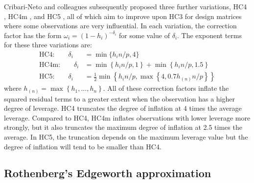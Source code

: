 \documentclass[12pt]{article}\usepackage[]{graphicx}\usepackage[]{color}
\begin{document}
Cribari-Neto and colleagues subsequently proposed three further variations, HC4 \citep{Cribari-Neto2004asymptotic}, HC4m \citep{Cribari-Neto2011new}, and HC5 \citep{Cribari-Neto2007inference}, all of which aim to improve upon HC3 for design matrices where some observations are very influential. 
In each variation, the correction factor has the form $\omega_i = \left(1 - h_i\right)^{-\delta_i}$ for some value of $\delta_i$. 
The exponent terms for these three variations are:
\begin{align*}
\text{HC4:} \qquad \delta_i &= \min\{h_i n / p, 4\} \\
\text{HC4m:} \qquad \delta_i &= \min\left\{h_i n / p, 1 \right\} + \min\left\{h_i n / p, 1.5 \right\} \\
\text{HC5:} \qquad \delta_i &= \frac{1}{2}\min\left\{h_i n / p, \max \left\{4, 0.7 h_{(n)} n / p\right\}\right\}
\end{align*}
where $h_{(n)} = \max\left\{h_{1},...,h_{n}\right\}$.
All of these correction factors inflate the squared residual terms to a greater extent when the observation has a higher degree of leverage. HC4 truncates the degree of inflation at 4 times the average leverage. Compared to HC4, HC4m inflates observations with lower leverage more strongly, but it also truncates the maximum degree of inflation at 2.5 times the average. In HC5, the truncation depends on the maximum leverage value but the degree of inflation will tend to be smaller than HC4. 

\subsection{Rothenberg's Edgeworth approximation}
\end{document}
